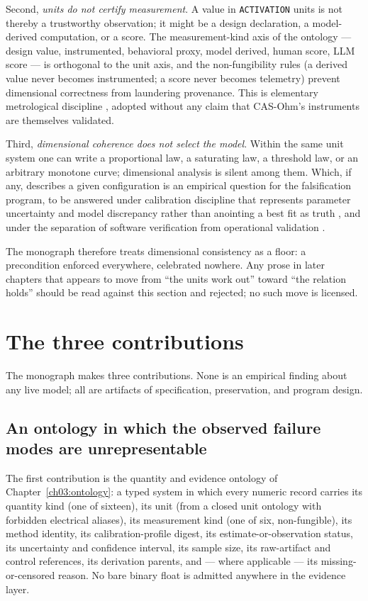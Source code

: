 Second, \emph{units do not certify measurement}. A value in \texttt{ACTIVATION} units is not thereby a trustworthy observation; it might be a design declaration, a model-derived computation, or a score. The measurement-kind axis of the ontology --- design value, instrumented, behavioral proxy, model derived, human score, LLM score --- is orthogonal to the unit axis, and the non-fungibility rules (a derived value never becomes instrumented; a score never becomes telemetry) prevent dimensional correctness from laundering provenance. This is elementary metrological discipline \cite{vim,gum}, adopted without any claim that CAS-Ohm's instruments are themselves validated.

Third, \emph{dimensional coherence does not select the model}. Within the same unit system one can write a proportional law, a saturating law, a threshold law, or an arbitrary monotone curve; dimensional analysis is silent among them. Which, if any, describes a given configuration is an empirical question for the falsification program, to be answered under calibration discipline that represents parameter uncertainty and model discrepancy rather than anointing a best fit as truth \cite{kennedyohagan}, and under the separation of software verification from operational validation \cite{sargent}.

The monograph therefore treats dimensional consistency as a floor: a precondition enforced everywhere, celebrated nowhere. Any prose in later chapters that appears to move from ``the units work out'' toward ``the relation holds'' should be read against this section and rejected; no such move is licensed.

\section{The three contributions}\label{ch01:contributions}

The monograph makes three contributions. None is an empirical finding about any live model; all are artifacts of specification, preservation, and program design.

\subsection{An ontology in which the observed failure modes are unrepresentable}\label{ch01:contrib:ontology}

The first contribution is the quantity and evidence ontology of Chapter~\ref{ch03:ontology}: a typed system in which every numeric record carries its quantity kind (one of sixteen), its unit (from a closed unit ontology with forbidden electrical aliases), its measurement kind (one of six, non-fungible), its method identity, its calibration-profile digest, its estimate-or-observation status, its uncertainty and confidence interval, its sample size, its raw-artifact and control references, its derivation parents, and --- where applicable --- its missing-or-censored reason. No bare binary float is admitted anywhere in the evidence layer.

